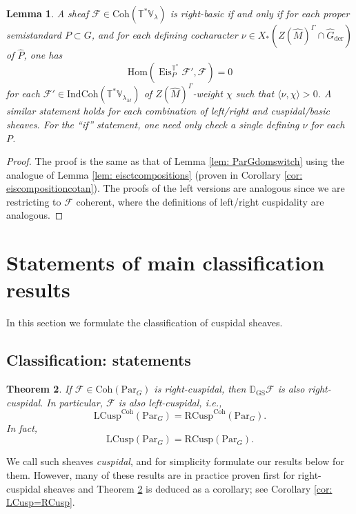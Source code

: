\documentclass{amsart}
\newtheorem{theorem}{Theorem}[subsection]
\newtheorem{lemma}[theorem]{Lemma}
\theoremstyle{definition}
\theoremstyle{remark}
\numberwithin{equation}{section}
\newcommand{\der}{\mathrm{der}}
\newcommand{\mc}{\mathcal}
\newcommand{\Hom}{\mathrm{Hom}}
\newcommand{\wh}{\widehat}
\newcommand{\D}{\mathbb{D}}
\newcommand{\Par}{\mathrm{Par}}
\newcommand{\IndCoh}{\mathrm{IndCoh}}
\DeclareMathOperator{\Eis}{\mathrm{Eis}}
\newcommand{\Coh}{\mathrm{Coh}}
\newcommand{\LCusp}{\mathrm{LCusp}}
\newcommand{\RCusp}{\mathrm{RCusp}}
\newcommand{\GS}{\mathrm{GS}}
\newcommand{\V}{\mathbb{V}}
\newcommand{\T}{\mathbb{T}}
\begin{document}
\begin{lemma}{\label{lem: cotangentdomswitch}}
    A sheaf $\mc{F} \in \Coh(\T^{\ast}\V_{\lambda})$ is right-basic if and only if for each proper semistandard $P \subset G$, and for each defining cocharacter $\nu \in X_{\ast}(Z(\wh{M})^{\Gamma} \cap \wh{G}_{\der})$ of $\wh{P}$, one has
    \begin{equation*}
        \Hom(\Eis^{\T^{\ast}}_P \mc{F}', \mc{F}) = 0 
    \end{equation*}
    for each $\mc{F}' \in \IndCoh(\T^{\ast} \V_{\lambda_M})$ of $Z(\wh M)^{\Gamma}$-weight $\chi$ such that $\langle \nu, \chi \rangle > 0$.  A similar statement holds for each combination of left/right and cuspidal/basic sheaves. For the ``if'' statement, one need only check a single defining $\nu$ for each $P$.
\end{lemma}

\begin{proof}
    The proof is the same as that of Lemma \ref{lem: ParGdomswitch} using the analogue of Lemma \ref{lem: eisctcompositions} (proven in Corollary \ref{cor: eiscompositioncotan}). The proofs of the left versions are analogous since we are restricting to $\mc{F}$ coherent, where the definitions of left/right cuspidality are analogous.
\end{proof}



\section{Statements of main classification results}{\label{s: statementsmain}}

In this section we formulate the classification of cuspidal sheaves.

\subsection{Classification: statements}

\begin{theorem}\label{thm:LCusp=RCusp}
If $\mc F\in \Coh(\Par_G)$ is right-cuspidal, then $\D_{\GS} \mc F$ is also right-cuspidal. In particular, $\mc F$ is also left-cuspidal, i.e., 
\[
\LCusp^{\Coh}(\Par_G)=\RCusp^{\Coh}(\Par_G).
\]
In fact, 
\[
\LCusp(\Par_G)=\RCusp(\Par_G).
\]
\end{theorem}

We call such sheaves \emph{cuspidal}, and for simplicity formulate our results below for them. However, many of these results are in practice proven first for right-cuspidal sheaves and Theorem \ref{thm:LCusp=RCusp} is deduced as a corollary; see Corollary \ref{cor: LCusp=RCusp}.  
\end{document}

